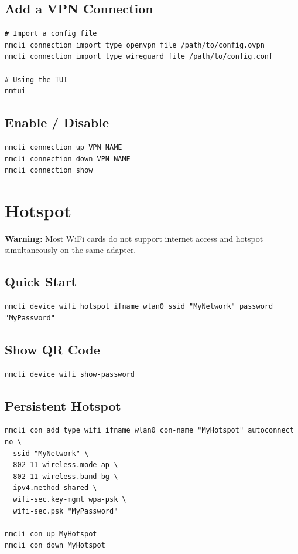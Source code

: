 \documentclass[12pt, a4paper]{book}
\begin{document}
\subsection{Add a VPN Connection}
\begin{lstlisting}
# Import a config file
nmcli connection import type openvpn file /path/to/config.ovpn
nmcli connection import type wireguard file /path/to/config.conf

# Using the TUI
nmtui
\end{lstlisting}

\subsection{Enable / Disable}
\begin{lstlisting}
nmcli connection up VPN_NAME
nmcli connection down VPN_NAME
nmcli connection show
\end{lstlisting}

\section{Hotspot}

\begin{warningbox}
\textbf{Warning:} Most WiFi cards do not support internet access and hotspot simultaneously on the same adapter.
\end{warningbox}

\subsection{Quick Start}
\begin{lstlisting}
nmcli device wifi hotspot ifname wlan0 ssid "MyNetwork" password "MyPassword"
\end{lstlisting}

\subsection{Show QR Code}
\begin{lstlisting}
nmcli device wifi show-password
\end{lstlisting}

\subsection{Persistent Hotspot}
\begin{lstlisting}
nmcli con add type wifi ifname wlan0 con-name "MyHotspot" autoconnect no \
  ssid "MyNetwork" \
  802-11-wireless.mode ap \
  802-11-wireless.band bg \
  ipv4.method shared \
  wifi-sec.key-mgmt wpa-psk \
  wifi-sec.psk "MyPassword"

nmcli con up MyHotspot
nmcli con down MyHotspot
\end{lstlisting}
\end{document}
